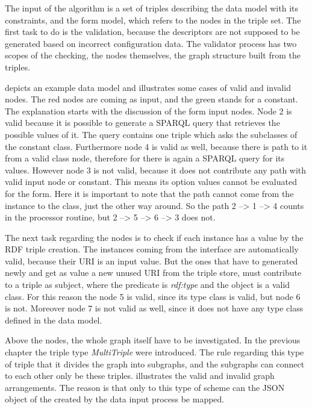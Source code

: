 The input of the algorithm is a set of triples describing the data model with its constraints, and the form model, which refers to the nodes in the triple set. The first task to do is the validation, because the descriptors are not supposed to be generated based on incorrect configuration data. The validator process has two scopes of the checking, the nodes themselves, the graph structure built from the triples.
 
 depicts an example data model and illustrates some cases of valid and invalid nodes. The red nodes are coming as input, and the green stands for a constant. The explanation starts with the discussion of the form input nodes. Node 2 is valid because it is possible to generate a SPARQL query that retrieves the possible values of it. The query contains one triple which asks the subclasses of the constant class. Furthermore node 4 is valid as well, because there is path to it from a valid class node, therefore for there is again a SPARQL query for its values. However node 3 is not valid, because it does not contribute any path with valid input node or constant. This means its option values cannot be evaluated for the form. Here it is important to note that the path cannot come from the instance to the class, just the other way around. So the path 2 --> 1 --> 4 counts in the processor routine, but 2 --> 5 --> 6 --> 3 does not.
  

The next task regarding the nodes is to check if each instance has a value by the RDF triple creation. The instances coming from the interface are automatically valid, because their URI is an input value. But the ones that have to generated newly and get as value a new unused URI from the triple store, must contribute to a triple as subject, where the predicate is \textit{rdf:type} and the object is a valid class. For this reason the node 5 is valid, since its type class is valid, but node 6 is not. Moreover node 7 is not valid as well, since it does not have any type class defined in the data model. 


Above the nodes, the whole graph itself have to be investigated. In the previous chapter the triple type \textit{MultiTriple} were introduced. The rule regarding this type of triple that it divides the graph into subgraphs, and the subgraphs can connect to each other only be these triples.  illustrates the valid and invalid graph arrangements. The reason is that only to this type of scheme can the JSON object of the created by the data input process be mapped.

